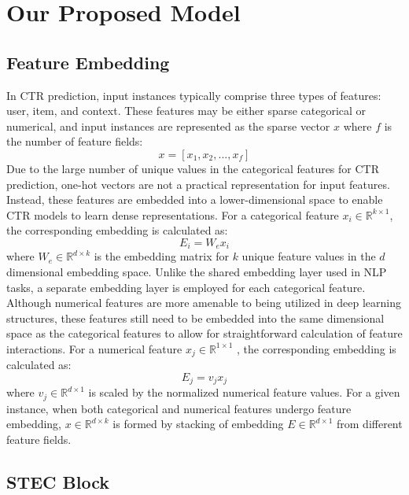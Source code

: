\documentclass{article}
\begin{document}
\section{Our Proposed Model}

\subsection{Feature Embedding}
In CTR prediction, input instances typically comprise three types of features: user, item, and context. These features may be either sparse categorical or numerical, and input instances are represented as the sparse vector $x$ where $f$ is the number of feature fields:
\begin{equation}
    x=[x_1,x_2,...,x_f ]
\end{equation}
Due to the large number of unique values in the categorical features for CTR prediction, one-hot vectors are not a practical representation for input features. Instead, these features are embedded into a lower-dimensional space to enable CTR models to learn dense representations. For a categorical feature $x_i \in \mathbb{R}^{k \times 1}$, the corresponding embedding is calculated as:     
\begin{equation}
    E_i=W_e x_i
\end{equation}
where $W_e \in \mathbb{R}^{d \times k}$ is the embedding matrix for $k$ unique feature values in the $d$ dimensional embedding space. Unlike the shared embedding layer used in NLP tasks, a separate embedding layer is employed for each categorical feature.
Although numerical features are more amenable to being utilized in deep learning structures, these features still need to be embedded into the same dimensional space as the categorical features to allow for straightforward calculation of feature interactions. For a numerical feature $x_j \in \mathbb{R}^{1 \times 1}$ , the corresponding embedding is calculated as:
\begin{equation}
    E_j=v_j x_j
\end{equation}
where $v_j \in \mathbb{R}^{d \times 1}$ is scaled by the normalized numerical feature values.
For a given instance, when both categorical and numerical features undergo feature embedding, $x \in \mathbb{R}^{d \times k}$ is formed by stacking of embedding $E \in \mathbb{R}^{d \times 1}$ from different feature fields. 

\subsection{STEC Block}
\end{document}
